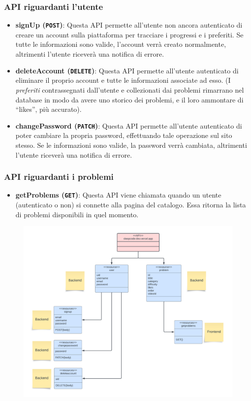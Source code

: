 \documentclass[11pt, a4paper]{article}
\theoremstyle{definition}
\begin{document}
\subsubsection{API riguardanti l'utente}
\begin{itemize}
  \item \textbf{signUp (\texttt{POST})}: Questa API permette all'utente non ancora autenticato di creare un account sulla piattaforma per tracciare i progressi e i preferiti. Se tutte le informazioni sono valide, l'account verrà creato normalmente, altrimenti l'utente riceverà una notifica di errore.
  \item \textbf{deleteAccount (\texttt{DELETE})}: Questa API permette all'utente autenticato di eliminare il proprio account e tutte le informazioni associate ad esso. (I \textit{preferiti} contrassegnati dall'utente e collezionati dai problemi rimarrano nel database in modo da avere uno storico dei problemi, e il loro ammontare di ``likes'', più accurato).
  \item \textbf{changePassword (\texttt{PATCH})}: Questa API permette all'utente autenticato di poter cambiare la propria password, effettuando tale operazione sul sito stesso. Se le informazioni sono valide, la password verrà cambiata, altrimenti l'utente riceverà una notifica di errore.
\end{itemize}

\subsubsection{API riguardanti i problemi}
\begin{itemize}
  \item \textbf{getProblems (\texttt{GET})}: Questa API viene chiamata quando un utente (autenticato o non) si connette alla pagina del catalogo. Essa ritorna la lista di problemi disponibili in quel momento.
\end{itemize}

\begin{figure}[H]
  \hspace*{-2cm}
  \centering
  \includegraphics[scale = 0.6]{materiale/Resource diagram.pdf}
\end{figure}
\end{document}
